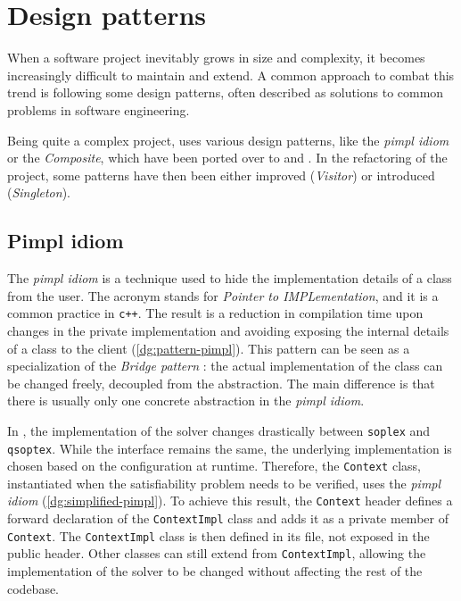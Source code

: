 \section{Design patterns}
\label{sec:patterns}

When a software project inevitably grows in size and complexity, it becomes increasingly difficult to maintain and extend.
A common approach to combat this trend is following some design patterns, often described as solutions to common problems in software engineering.

Being quite a complex project, \dreal uses various design patterns, like the \textit{pimpl idiom} or the \textit{Composite}, which have been ported over to \dlinearfour and \dlinear .
In the refactoring of the project, some patterns have then been either improved (\textit{Visitor}) or introduced (\textit{Singleton}).

\subsection*{Pimpl idiom}

The \textit{pimpl idiom} \cite{man:pimpl} is a technique used to hide the implementation details of a class from the user.
The acronym stands for \textit{Pointer to IMPLementation}, and it is a common practice in \texttt{c++}.
The result is a reduction in compilation time upon changes in the private implementation and avoiding exposing the internal details of a class to the client (\autoref{dg:pattern-pimpl}).
This pattern can be seen as a specialization of the \textit{Bridge pattern} \cite{book:gof}: the actual implementation of the class can be changed freely, decoupled from the abstraction.
The main difference is that there is usually only one concrete abstraction in the \textit{pimpl idiom}.


In \dlinear, the implementation of the solver changes drastically between \texttt{soplex} and \texttt{qsoptex}.
While the interface remains the same, the underlying implementation is chosen based on the configuration at runtime.
Therefore, the \texttt{Context} class, instantiated when the satisfiability problem needs to be verified, uses the \textit{pimpl idiom} (\autoref{dg:simplified-pimpl}).
To achieve this result, the \texttt{Context} header defines a forward declaration of the \texttt{ContextImpl} class and adds it as a private member of \texttt{Context}.
The \texttt{ContextImpl} class is then defined in its file, not exposed in the public header.
Other classes can still extend from \texttt{ContextImpl}, allowing the implementation of the solver to be changed without affecting the rest of the codebase.

